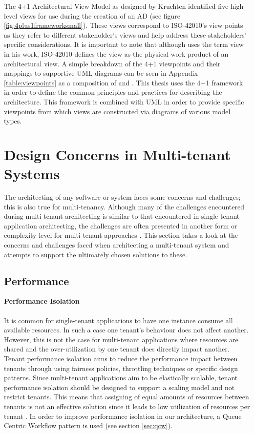 The 4+1 Architectural View Model as designed by Kruchten \cite{Kruchten} identified five high level views for use during the creation of an AD (see figure \ref{fig:4plus1frameworksmall}). These views correspond to ISO-42010's view points as they refer to different stakeholder's views and help address these stakeholders' specific considerations. It is important to note that although \cite{Kruchten} uses the term view in his work, ISO-42010 defines the view as the physical work product of an architectural view. A simple breakdown of the 4+1 viewpoints and their mappings to supportive UML diagrams can be seen in Appendix \ref{table:viewpoints} as a composition of \cite{Muchandi2007} and \cite{Kruchten}. This thesis uses the 4+1 framework in order to define the common principles and practices for describing the architecture. This framework is combined with UML in order to provide specific viewpoints from which views are constructed via diagrams of various model types.



\section{Design Concerns in Multi-tenant Systems}
The architecting of any software or system faces some concerns and challenges; this is also true for multi-tenancy. Although many of the challenges encountered during multi-tenant architecting is similar to that encountered in single-tenant application architecting, the challenges are often presented in another form or complexity level for multi-tenant approaches \cite{Bezemer:2010:MSA:1862372.1862393}. This section takes a look at the concerns and challenges faced when architecting a multi-tenant system and attempts to support the ultimately chosen solutions to these.

\subsection{Performance}
\label{sec:performance}
\textbf{Performance Isolation}
\\
\\
It is common for single-tenant applications to have one instance consume all available resources. In such a case one tenant's behaviour does not affect another. However, this is not the case for multi-tenant applications where resources are shared and the over-utilization by one tenant does directly impact another. Tenant performance isolation aims to reduce the performance impact between tenants through using fairness policies, throttling techniques or specific design patterns. Since multi-tenant applications aim to be elastically scalable, tenant performance isolation should be designed to support a scaling model and not restrict tenants. This means that assigning of equal amounts of resources between tenants is not an effective solution since it leads to low utilization of resources per tenant \cite{Bezemer:2010:MSA:1862372.1862393}. In order to improve performance isolation in our architecture, a Queue Centric Workflow pattern is used (see section \ref{sec:qcw}). 


